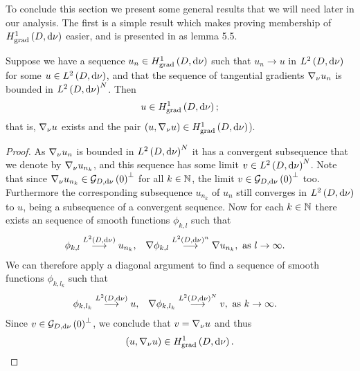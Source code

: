 To conclude this section we present some general results that we will need later in our analysis.
The first is a simple result which makes proving membership of $H^1_\mathrm{grad}\left( D, \mathrm{d}\nu \right)$ easier, and is presented in \cite{zhikov2002homogenization} as lemma 5.5.
\begin{prop} \label{prop:Lemma5-5}
	Suppose we have a sequence $u_n\in H^1_\mathrm{grad}\left( D, \mathrm{d}\nu \right)$ such that $u_n\rightarrow u$ in $L^{2}\left( D,\mathrm{d}\nu \right)$ for some $u\in L^{2}\left( D,\mathrm{d}\nu \right)$, and that the sequence of tangential gradients $\nabla_\nu u_n$ is bounded in $L^{2}\left( D,\mathrm{d}\nu \right)^N$.
	Then 
	\begin{align*}
		u\in H^1_\mathrm{grad}\left( D, \mathrm{d}\nu \right);
	\end{align*}
	that is, $\nabla_{\nu} u$ exists and the pair $\left( u,\nabla_{\nu} u \right)\in H^1_\mathrm{grad}\left( D, \mathrm{d}\nu \right)$).
\end{prop}
\begin{proof}
	As $\nabla_\nu u_n$ is bounded in $L^{2}\left( D,\mathrm{d}\nu \right)^N$ it has a convergent subsequence that we denote by $\nabla_\nu u_{n_k}$, and this sequence has some limit $v\in L^{2}\left( D,\mathrm{d}\nu \right)^N$.
	Note that since $\nabla_\nu u_{n_k}\in\mathcal{G}_{ D, \mathrm{d}\nu}\left( 0 \right)^\perp$ for all $k\in\mathbb{N}$, the limit $v\in\mathcal{G}_{ D, \mathrm{d}\nu}\left( 0 \right)^\perp$ too.
	Furthermore the corresponding subsequence $u_{n_k}$ of $u_n$ still converges in $L^{2}\left( D,\mathrm{d}\nu \right)$ to $u$, being a subsequence of a convergent sequence.
	Now for each $k\in\mathbb{N}$ there exists an sequence of smooth functions $\phi_{k,l}$ such that
	\begin{align*}
		\phi_{k,l}\overset{L^{2}\left( D,\mathrm{d}\nu \right)}{\longrightarrow} u_{n_k}, &\quad \nabla\phi_{k,l}\overset{L^{2}\left( D,\mathrm{d}\nu \right)^n}{\longrightarrow}\nabla u_{n_k}, \ \text{as} \ l \rightarrow\infty.
	\end{align*}
	We can therefore apply a diagonal argument to find a sequence of smooth functions $\phi_{k, l_k}$ such that
	\begin{align*}
		\phi_{k,l_k}\overset{L^{2}\left( D,\mathrm{d}\nu \right)}{\longrightarrow} u, &\quad \nabla\phi_{k,l_k}\overset{L^{2}\left( D,\mathrm{d}\nu \right)^N}{\longrightarrow}v, \ \text{as} \ k \rightarrow\infty.
	\end{align*}
	Since $v\in\mathcal{G}_{ D, \mathrm{d}\nu}\left( 0 \right)^\perp$, we conclude that $v = \nabla_\nu u$ and thus
	\begin{align*}
		\left( u, \nabla_\nu u \right)\in H^1_\mathrm{grad}\left( D, \mathrm{d}\nu \right).
	\end{align*}
\end{proof}

